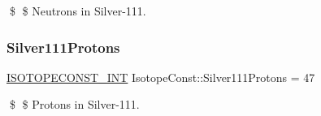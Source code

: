 \$ \$ Neutrons in Silver-\/111. \mbox{\label{group___isotope_const-_silver-_ag111_gaccb4cc0b94ff7ee57fde7dfc91ad0fd5}} 
\subsubsection{\texorpdfstring{Silver111\+Protons}{Silver111Protons}}
{\footnotesize\ttfamily \mbox{\hyperlink{group___isotope_const-_macros_ga5f18360b3e99483a35c32d789e62621c}{I\+S\+O\+T\+O\+P\+E\+C\+O\+N\+S\+T\+\_\+\+I\+NT}} Isotope\+Const\+::\+Silver111\+Protons = 47}

\$ \$ Protons in Silver-\/111. 